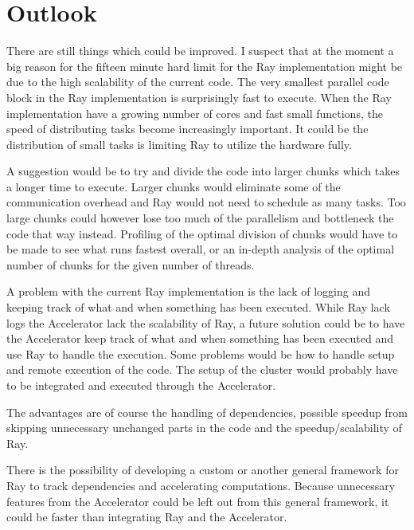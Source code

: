 \documentclass[12pt, a4paper]{article}
\begin{document}

\section{Outlook}

There are still things which could be improved.
I suspect that at the moment a big reason for the fifteen minute hard limit for the Ray implementation might be due to the high scalability of the current code.
The very smallest parallel code block in the Ray implementation is surprisingly fast to execute.
When the Ray implementation have a growing number of cores and fast small functions, the speed of distributing tasks become increasingly important.
It could be the distribution of small tasks is limiting Ray to utilize the hardware fully.

A suggestion would be to try and divide the code into larger chunks which takes a longer time to execute.
Larger chunks would eliminate some of the communication overhead and Ray would not need to schedule as many tasks.
Too large chunks could however lose too much of the parallelism and bottleneck the code that way instead.
Profiling of the optimal division of chunks would have to be made to see what runs fastest overall, or an in-depth analysis of the optimal number of chunks for the given number of threads.

A problem with the current Ray implementation is the lack of logging and keeping track of what and when something has been executed.
While Ray lack logs the Accelerator lack the scalability of Ray, a future solution could be to have the Accelerator keep track of what and when something has been executed and use Ray to handle the execution.
Some problems would be how to handle setup and remote execution of the code.
The setup of the cluster would probably have to be integrated and executed through the Accelerator.

The advantages are of course the handling of dependencies, possible speedup from skipping unnecessary unchanged parts in the code and the speedup/scalability of Ray.

There is the possibility of developing a custom or another general framework for Ray to track dependencies and accelerating computations.
Because unnecessary features from the Accelerator could be left out from this general framework, it could be faster than integrating Ray and the Accelerator.
\end{document}
